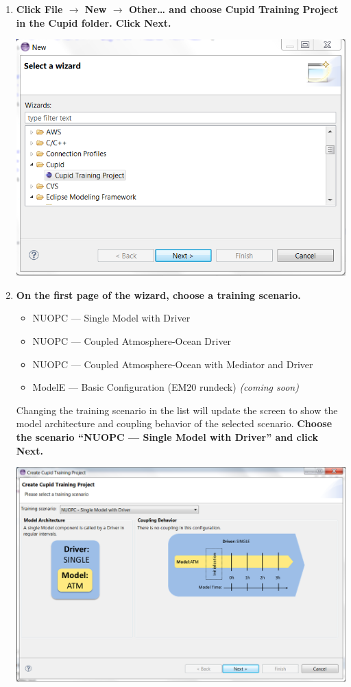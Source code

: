 \documentclass[oneside,11pt]{memoir}
\begin{document}
\begin{enumerate}

\item \textbf{Click File $\rightarrow$ New $\rightarrow$ Other… and choose Cupid Training Project in the Cupid folder.  Click Next.}

\parbox{\linewidth}{\centering
  \includegraphics{figs/cloud_fig1.png}
}


\item \textbf{On the first page of the wizard, choose a training scenario.  }

\begin{itemize}
\item NUOPC --- Single Model with Driver
\item NUOPC --- Coupled Atmosphere-Ocean Driver
\item NUOPC --- Coupled Atmosphere-Ocean with Mediator and Driver
\item ModelE --- Basic Configuration (EM20 rundeck) \emph{(coming soon)}
\end{itemize}

Changing the training scenario in the list will update the screen to show the model architecture and coupling behavior of the selected scenario.  \textbf{Choose the scenario ``NUOPC --- Single Model with Driver'' and click Next.}

\parbox{\linewidth}{\centering
  \includegraphics[width=\textwidth]{figs/cloud_fig2.png}
}



\end{enumerate}
\end{document}
